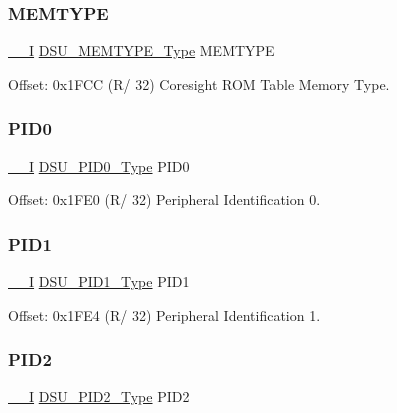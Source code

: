 \subsubsection{\texorpdfstring{MEMTYPE}{MEMTYPE}}
{\footnotesize\ttfamily \mbox{\hyperlink{core__cm0plus_8h_af63697ed9952cc71e1225efe205f6cd3}{\+\_\+\+\_\+I}} \mbox{\hyperlink{union_d_s_u___m_e_m_t_y_p_e___type}{D\+S\+U\+\_\+\+M\+E\+M\+T\+Y\+P\+E\+\_\+\+Type}} M\+E\+M\+T\+Y\+PE}



Offset\+: 0x1\+F\+CC (R/ 32) Coresight R\+OM Table Memory Type. 

\mbox{\label{struct_dsu_a522c107da63b44519cdbbdd30f0b9b44}} 
\subsubsection{\texorpdfstring{PID0}{PID0}}
{\footnotesize\ttfamily \mbox{\hyperlink{core__cm0plus_8h_af63697ed9952cc71e1225efe205f6cd3}{\+\_\+\+\_\+I}} \mbox{\hyperlink{union_d_s_u___p_i_d0___type}{D\+S\+U\+\_\+\+P\+I\+D0\+\_\+\+Type}} P\+I\+D0}



Offset\+: 0x1\+F\+E0 (R/ 32) Peripheral Identification 0. 

\mbox{\label{struct_dsu_afb83c5463380bc4b86a3ea40ad4aaab6}} 
\subsubsection{\texorpdfstring{PID1}{PID1}}
{\footnotesize\ttfamily \mbox{\hyperlink{core__cm0plus_8h_af63697ed9952cc71e1225efe205f6cd3}{\+\_\+\+\_\+I}} \mbox{\hyperlink{union_d_s_u___p_i_d1___type}{D\+S\+U\+\_\+\+P\+I\+D1\+\_\+\+Type}} P\+I\+D1}



Offset\+: 0x1\+F\+E4 (R/ 32) Peripheral Identification 1. 

\mbox{\label{struct_dsu_a0d3035ce892197d08526ac79b69cd927}} 
\subsubsection{\texorpdfstring{PID2}{PID2}}
{\footnotesize\ttfamily \mbox{\hyperlink{core__cm0plus_8h_af63697ed9952cc71e1225efe205f6cd3}{\+\_\+\+\_\+I}} \mbox{\hyperlink{union_d_s_u___p_i_d2___type}{D\+S\+U\+\_\+\+P\+I\+D2\+\_\+\+Type}} P\+I\+D2}



